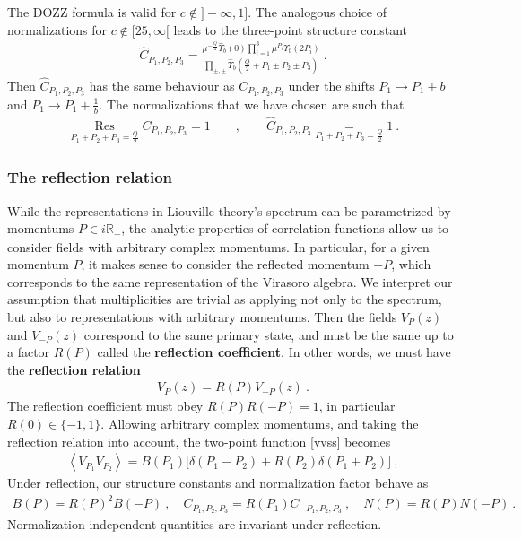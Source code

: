 \documentclass[12pt, a4paper, notitlepage, twoside]{report}
\numberwithin{equation}{section}
\theoremstyle{break}
\begin{document}
The DOZZ formula is valid for $c\notin ]-\infty, 1]$. The analogous choice of normalizations for $c\notin [25,\infty[$ leads to the three-point structure constant 
\begin{align}
 \hat C_{P_1,P_2,P_3} =  \frac{\mu^{-\frac{Q}{2}}\hat\Upsilon_b(0)\prod_{i=1}^3 \mu^{P_i}\hat\Upsilon_b(2P_i) }{\prod_{\pm,\pm} \hat\Upsilon_b\left(\tfrac{Q}{2}+P_1\pm P_2 \pm P_3\right)} \ .
\label{hc}
\end{align}
Then $\hat C_{P_1,P_2,P_3}$ has the same behaviour as $C_{P_1,P_2,P_3}$ under the shifts $P_1\to P_1+b$ and $P_1\to P_1+\frac{1}{b}$. The normalizations that we have chosen are such that
\begin{align}
 \underset{P_1+P_2+P_3=\frac{Q}{2}}{\operatorname{Res}} C_{P_1,P_2,P_3} = 1 \qquad , \qquad \hat C_{P_1,P_2,P_3}\underset{P_1+P_2+P_3=\frac{Q}{2}}{=} 1\ .
\label{chco}
 \end{align}

\subsubsection{The reflection relation}

While the representations in Liouville theory's spectrum can be parametrized by momentums $P\in i\mathbb{R}_+$, the analytic properties of correlation functions allow us to consider fields with arbitrary complex momentums. 
In particular, for a given momentum $P$, it makes sense to consider the reflected momentum $-P$, which corresponds to the same representation of the Virasoro algebra. 
We interpret our assumption that multiplicities are trivial as applying not only to the spectrum, but also to representations with arbitrary momentums. Then the fields $V_P(z)$ and $V_{-P}(z)$ correspond to the same primary state, and must be the same up to a factor $R(P)$ called the \textbf{\boldmath reflection coefficient}. In other words, we must have the \textbf{\boldmath reflection relation}
\begin{align}
V_P(z)= R(P) V_{-P}(z)\ .
\label{vrv}
\end{align}
The reflection coefficient must obey $R(P)R(-P)=1$, in particular $R(0)\in \{-1,1\}$. Allowing arbitrary complex momentums, and taking the reflection relation into account, the two-point function \eqref{vvss} becomes 
\begin{align}
 \left<V_{P_1}V_{P_2}\right> = B(P_1)\Big[ \delta(P_1-P_2) + R(P_2)\delta(P_1+P_2) \Big]\ ,
\end{align}
Under reflection, our structure constants and normalization factor behave as 
\begin{align}
 B(P)=R(P)^2B(-P) \ , \quad C_{P_1,P_2,P_3} = R(P_1) C_{-P_1,P_2,P_3} \ , \quad N(P)=R(P)N(-P)\ .
\end{align}
Normalization-independent quantities are invariant under reflection.
\end{document}
